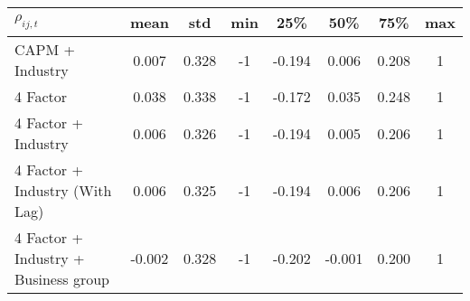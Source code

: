 \begin{tabular}{lccccccc}
\hline\hline
$ \rho_{ij,t} $  & {mean} &{std} &{min} & 25\%  & 50\%  & 75\%  & {max} \\
 \hline
    
    CAPM + Industry & 0.007 & 0.328 & -1    & -0.194 & 0.006 & 0.208 & 1 \\
    4 Factor & 0.038 & 0.338 & -1    & -0.172 & 0.035 & 0.248 & 1 \\
    4 Factor + Industry & 0.006 & 0.326 & -1    & -0.194 & 0.005 & 0.206 & 1 \\
    4 Factor + Industry (With Lag) & 0.006 & 0.325 & -1    & -0.194 & 0.006 & 0.206 & 1 \\
4 Factor + Industry + Business group & -0.002 & 0.328 & -1    & -0.202 & -0.001 & 0.200 & 1 \\

    

\hline\hline
    \end{tabular}